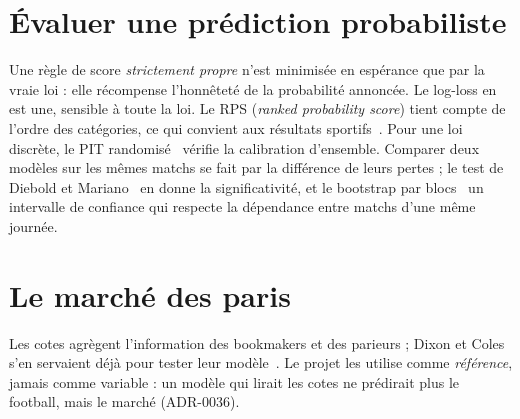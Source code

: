 \section{Évaluer une prédiction probabiliste}

Une règle de score \emph{strictement propre} n'est minimisée en espérance que par la vraie loi
\cite{gneiting2007} : elle récompense l'honnêteté de la probabilité annoncée. Le log-loss en est une,
sensible à toute la loi. Le RPS (\emph{ranked probability score}) tient compte de l'ordre des
catégories, ce qui convient aux résultats sportifs~\cite{constantinou2012}. Pour une loi discrète, le
PIT randomisé~\cite{czado2009} vérifie la calibration d'ensemble. Comparer deux modèles sur les mêmes
matchs se fait par la différence de leurs pertes ; le test de Diebold et Mariano~\cite{diebold1995}
en donne la significativité, et le bootstrap par blocs~\cite{kunsch1989} un intervalle de confiance
qui respecte la dépendance entre matchs d'une même journée.

\section{Le marché des paris}

Les cotes agrègent l'information des bookmakers et des parieurs ; Dixon et Coles s'en servaient déjà
pour tester leur modèle~\cite{dixon1997}. Le projet les utilise comme \emph{référence}, jamais comme
variable : un modèle qui lirait les cotes ne prédirait plus le football, mais le marché (ADR-0036).
